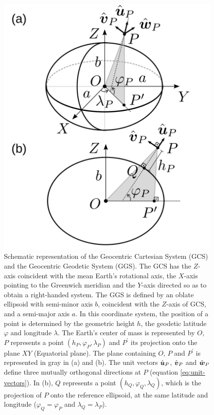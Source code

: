 \documentclass[extra]{gji}
\begin{document}
\begin{figure}
    \includegraphics{figures/cartesian-geodetic-systems.png}
    \caption{Schematic representation of the Geocentric Cartesian System (GCS) and the Geocentric Geodetic System (GGS). The GCS has the $Z$-axis coincident with the mean Earth's rotational axis,
    the $X$-axis pointing to the Greenwich meridian and the $Y$-axis
    directed so as to obtain a right-handed system. The GGS is      defined by an oblate ellipsoid with semi-minor axis $b$, 
    coincident with the $Z$-axis of GCS, and a semi-major
    axis $a$. In this coordinate system, the position of a point is
    determined by the geometric height $h$, the geodetic latitude 
    $\varphi$ and longitude $\lambda$. 
    The Earth's center of mass is represented 
    by $O$, $P$ represents a point $(h_{P}, \varphi_{P}, \lambda_{P})$ and $P^{\prime}$ its projection onto the plane $XY$ 
    (Equatorial plane). The plane containing $O$, $P$ and 
    $P^{\prime}$ is represented in gray in (a) and (b). 
    The unit vectors $\hat{\mitbf{u}}_{P}$, $\hat{\mitbf{v}}_{P}$ and 
    $\hat{\mitbf{w}}_{P}$ define three mutually orthogonal 
    directions at $P$ (equation \ref{eq:unit-vectors}).
    In (b), $Q$ represents a point $(h_{Q}, \varphi_{Q}, \lambda_{Q})$,
    which is the projection of $P$ onto the reference ellipsoid, at
    the same latitude and longitude ($\varphi_{Q} = \varphi_{P}$ and $\lambda_{Q} = \lambda_{P}$).}
  \label{fig:GCS-GGS}
\end{figure}
\end{document}
